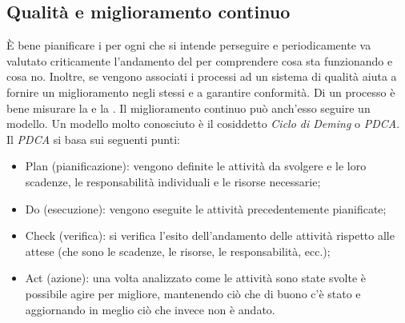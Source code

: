 \documentclass[../main.tex]{subfiles}
\begin{document}
\subsection{Qualità e miglioramento continuo}
È bene pianificare i  per ogni  che si intende perseguire e periodicamente va valutato criticamente l'andamento del  per comprendere cosa sta funzionando e cosa no.
Inoltre, se vengono associati i processi ad un sistema di qualità aiuta a fornire un miglioramento negli stessi e a garantire conformità. Di un processo è bene misurare la  e la .
Il miglioramento continuo può anch'esso seguire un modello. Un modello molto conosciuto è il cosiddetto \textit{Ciclo di Deming} o \textit{PDCA}.
Il \textit{PDCA} si basa sui seguenti punti:
\begin{itemize}
    \item Plan (pianificazione): vengono definite le attività da svolgere e le loro scadenze, le responsabilità individuali e le risorse necessarie;
    \item Do (esecuzione): vengono eseguite le attività precedentemente pianificate;
    \item Check (verifica): si verifica l'esito dell'andamento delle attività rispetto alle attese (che sono le scadenze, le risorse, le responsabilità, ecc.);
    \item Act (azione): una volta analizzato come le attività sono state svolte è possibile agire per migliore, mantenendo ciò che di buono c'è stato e aggiornando in meglio ciò che invece non è andato.
\end{itemize}
\end{document}
